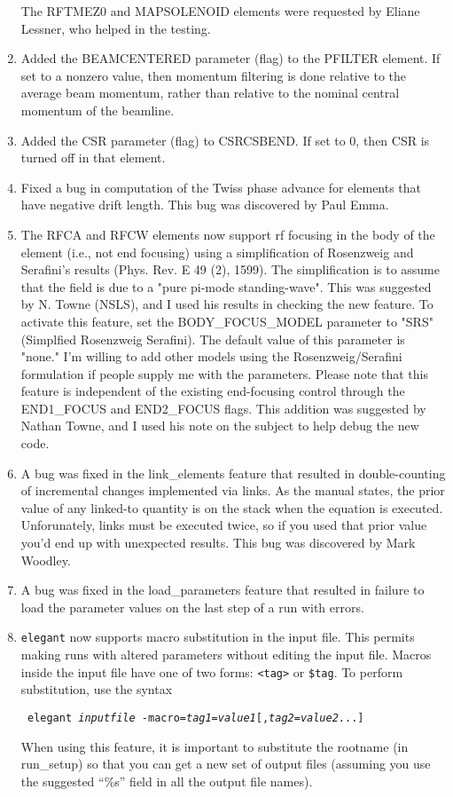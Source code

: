 \begin{enumerate}
The RFTMEZ0 and MAPSOLENOID elements were requested by Eliane Lessner, who
helped in the testing.

\item  Added the BEAMCENTERED parameter (flag) to the PFILTER element. If set to
a nonzero value, then momentum filtering is done relative to the average beam
momentum, rather than relative to the nominal central momentum of the beamline.

\item Added the CSR parameter (flag) to CSRCSBEND.  If set to 0, then CSR is turned
off in that element.

\item Fixed a bug in computation of the Twiss phase advance for elements
that have negative drift length.  This bug was discovered by Paul Emma.

\item The RFCA and RFCW elements now support rf focusing in the body
of the element (i.e., not end focusing) using a simplification of
Rosenzweig and Serafini's results (Phys. Rev. E 49 (2), 1599).  The
simplification is to assume that the field is due to a "pure pi-mode
standing-wave".  This was suggested by N. Towne (NSLS), and I used his
results in checking the new feature.  To activate this feature, set
the BODY\_FOCUS\_MODEL parameter to "SRS" (Simplfied Rosenzweig
Serafini).  The default value of this parameter is "none."  I'm
willing to add other models using the Rosenzweig/Serafini formulation
if people supply me with the parameters.  Please note that this
feature is independent of the existing end-focusing control through
the END1\_FOCUS and END2\_FOCUS flags.  This addition was suggested by
Nathan Towne, and I used his note on the subject to help debug the new
code.

\item A bug was fixed in the link\_elements feature that resulted in
double-counting of incremental changes implemented via links.  As the
manual states, the prior value of any linked-to quantity is on the
stack when the equation is executed.  Unforunately, links must be
executed twice, so if you used that prior value you'd end up with
unexpected results.  This bug was discovered by Mark Woodley.

\item A bug was fixed in the load\_parameters feature that resulted in
failure to load the parameter values on the last step of a run with
errors.

\item {\tt elegant} now supports macro substitution in the input file.
This permits making runs with altered parameters without editing the input
file.  Macros inside the input file have one of two forms: \verb|<tag>|
or \verb|$tag|.  To perform substitution, use the syntax
\begin{flushleft}{\tt
elegant {\em inputfile} -macro={\em tag1}={\em value1}[,{\em tag2}={\em value2}...]
}\end{flushleft}
When using this feature, it is important to substitute the rootname
(in run\_setup) so that you can get a new set of output files (assuming
you use the suggested ``\%s'' field in all the output file names).


\end{enumerate}
